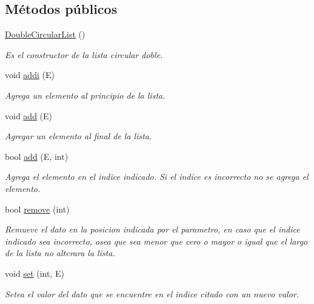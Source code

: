 \subsection*{Métodos públicos}
\begin{DoxyCompactItemize}
\item 
\hypertarget{classDoubleCircularList_a533876254e3c837d556542eda9968f8b}{\hyperlink{classDoubleCircularList_a533876254e3c837d556542eda9968f8b}{Double\-Circular\-List} ()}\label{classDoubleCircularList_a533876254e3c837d556542eda9968f8b}

\begin{DoxyCompactList}\small\item\em Es el constructor de la lista circular doble. \end{DoxyCompactList}\item 
void \hyperlink{classDoubleCircularList_aec3cb982a2b9def7eb254ef206101e28}{addi} (E)
\begin{DoxyCompactList}\small\item\em Agrega un elemento al principio de la lista. \end{DoxyCompactList}\item 
void \hyperlink{classDoubleCircularList_a7691d38e77ea44d222c465f27e7d05b6}{add} (E)
\begin{DoxyCompactList}\small\item\em Agregar un elemento al final de la lista. \end{DoxyCompactList}\item 
bool \hyperlink{classDoubleCircularList_a6d76f7045dd9997f55c6c2feb80678da}{add} (E, int)
\begin{DoxyCompactList}\small\item\em Agrega el elemento en el indice indicado. Si el indice es incorrecto no se agrega el elemento. \end{DoxyCompactList}\item 
bool \hyperlink{classDoubleCircularList_ae7ed8b6714720cb7daafa639f232ecc3}{remove} (int)
\begin{DoxyCompactList}\small\item\em Remueve el dato en la posicion indicada por el parametro, en caso que el indice indicado sea incorrecto, osea que sea menor que cero o mayor o igual que el largo de la lista no alterara la lista. \end{DoxyCompactList}\item 
void \hyperlink{classDoubleCircularList_a95e0f27bda1158233015ee3ff27b3ade}{set} (int, E)
\begin{DoxyCompactList}\small\item\em Setea el valor del dato que se encuentre en el indice citado con un nuevo valor. \end{DoxyCompactList}\item 

\end{DoxyCompactItemize}
